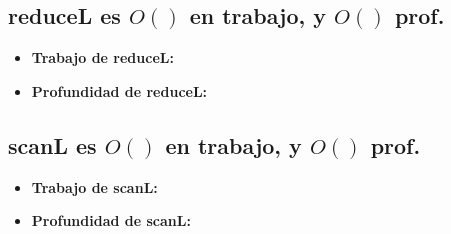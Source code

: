 \documentclass[12pt]{article}
\begin{document}
\subsection{reduceL es $O()$ en trabajo, y $O()$ prof.}

\begin{itemize}

\item \textbf{Trabajo de reduceL:}


\item \textbf{Profundidad de reduceL:}
    
\end{itemize}


\subsection{scanL es $O()$ en trabajo, y $O()$ prof.}

\begin{itemize}

\item \textbf{Trabajo de scanL:}


\item \textbf{Profundidad de scanL:}
    
\end{itemize}
\end{document}
